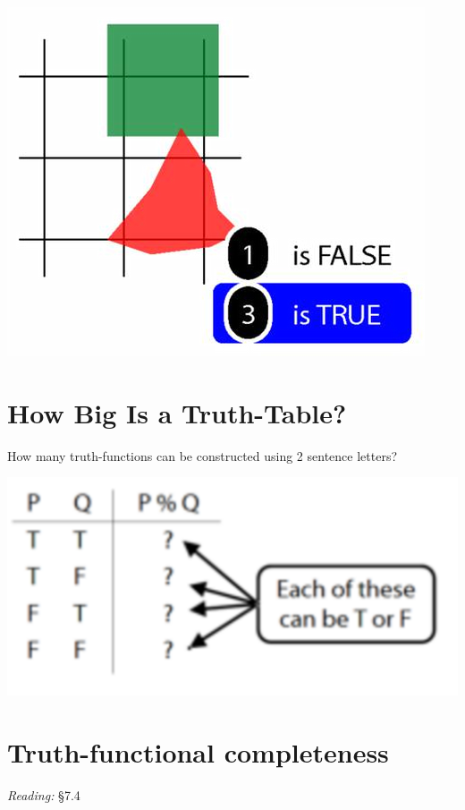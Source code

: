 \documentclass[12pt]{extarticle}
\begin{document}
\begin{multicols*}{3}
\begin{center}
\includegraphics[scale=0.3]{img/unit_572_proof2.png}
\end{center}
 
 
\section{How Big Is a Truth-Table?}
 
How many truth-functions can be constructed using 2 sentence letters?
 
\begin{center}
\includegraphics[scale=0.3]{img/unit_430_fig1.pdf}
\end{center}
 
 
\section{Truth-functional completeness}
 
\emph{Reading:} §7.4
 

\end{multicols*}
\end{document}
